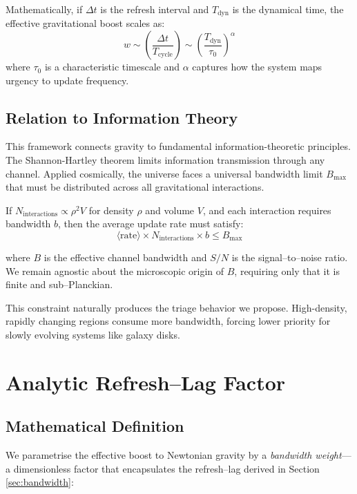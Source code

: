 \documentclass[twocolumn,prd,amsmath,amssymb,aps,superscriptaddress,nofootinbib]{revtex4-2}
\begin{document}
Mathematically, if $\Delta t$ is the refresh interval and $T_{\text{dyn}}$ is the dynamical time, the effective gravitational boost scales as:
\begin{equation}
w \sim \left(\frac{\Delta t}{T_{\text{cycle}}}\right) \sim \left(\frac{T_{\text{dyn}}}{\tau_0}\right)^\alpha
\label{eq:boost_scaling}
\end{equation}
where $\tau_0$ is a characteristic timescale and $\alpha$ captures how the system maps urgency to update frequency.

\subsection{Relation to Information Theory}

This framework connects gravity to fundamental information-theoretic principles. The Shannon-Hartley theorem limits information transmission through any channel. Applied cosmically, the universe faces a universal bandwidth limit $B_{\text{max}}$ that must be distributed across all gravitational interactions.

If $N_{\text{interactions}} \propto \rho^2 V$ for density $\rho$ and volume $V$, and each interaction requires bandwidth $b$, then the average update rate must satisfy:
\begin{equation}
\langle \text{rate} \rangle \times N_{\text{interactions}} \times b \leq B_{\text{max}}
\end{equation}

where $B$ is the effective channel bandwidth and $S/N$ is the
signal--to--noise ratio.  We remain agnostic about the microscopic
origin of $B$, requiring only that it is finite and sub--Planckian.

This constraint naturally produces the triage behavior we propose. High-density, rapidly changing regions consume more bandwidth, forcing lower priority for slowly evolving systems like galaxy disks.

\section{Analytic Refresh--Lag Factor}
\label{sec:formalism}

\subsection{Mathematical Definition}

We parametrise the effective boost to Newtonian gravity by a
\emph{bandwidth weight}---a dimensionless factor that encapsulates the
refresh--lag derived in Section\,\ref{sec:bandwidth}:
\end{document}
